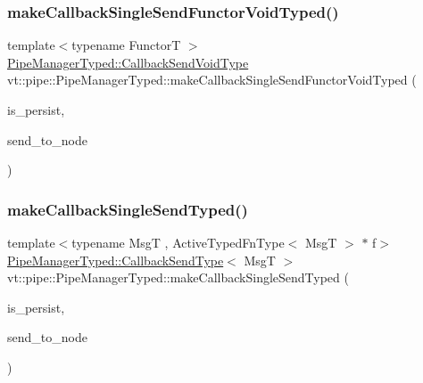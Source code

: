 \mbox{\label{structvt_1_1pipe_1_1_pipe_manager_typed_a2bb010b0f35b6587eb65a637443e5243}} 
\subsubsection{\texorpdfstring{make\+Callback\+Single\+Send\+Functor\+Void\+Typed()}{makeCallbackSingleSendFunctorVoidTyped()}}
{\footnotesize\ttfamily template$<$typename FunctorT $>$ \\
\hyperlink{structvt_1_1pipe_1_1_pipe_manager_typed_a09eb51f50878116c3b0867fad5f9aab0}{Pipe\+Manager\+Typed\+::\+Callback\+Send\+Void\+Type} vt\+::pipe\+::\+Pipe\+Manager\+Typed\+::make\+Callback\+Single\+Send\+Functor\+Void\+Typed (\begin{DoxyParamCaption}\item[{bool const}]{is\+\_\+persist,  }\item[{\hyperlink{namespacevt_a866da9d0efc19c0a1ce79e9e492f47e2}{Node\+Type} const \&}]{send\+\_\+to\+\_\+node }\end{DoxyParamCaption})}

\mbox{\label{structvt_1_1pipe_1_1_pipe_manager_typed_ac39b55392dbfc09be9f2abe1c68a0e2a}} 
\subsubsection{\texorpdfstring{make\+Callback\+Single\+Send\+Typed()}{makeCallbackSingleSendTyped()}}
{\footnotesize\ttfamily template$<$typename MsgT , Active\+Typed\+Fn\+Type$<$ Msg\+T $>$ $\ast$ f$>$ \\
\hyperlink{structvt_1_1pipe_1_1_pipe_manager_typed_a306c7c126ed7fb6c5b53bfcf38726291}{Pipe\+Manager\+Typed\+::\+Callback\+Send\+Type}$<$ MsgT $>$ vt\+::pipe\+::\+Pipe\+Manager\+Typed\+::make\+Callback\+Single\+Send\+Typed (\begin{DoxyParamCaption}\item[{bool const}]{is\+\_\+persist,  }\item[{\hyperlink{namespacevt_a866da9d0efc19c0a1ce79e9e492f47e2}{Node\+Type} const \&}]{send\+\_\+to\+\_\+node }\end{DoxyParamCaption})}

